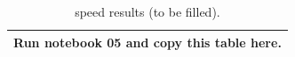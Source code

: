 \begin{table}[h]\centering\caption{speed results (to be filled).}\small\begin{tabular}{l}\toprule Run notebook 05 and copy this table here.\\\bottomrule\end{tabular}\end{table}
